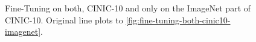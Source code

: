 \begin{figure}
\caption{Fine-Tuning on both, CINIC-10 and only on the ImageNet part of CINIC-10. Original line plots to \cref{fig:fine-tuning-both-cinic10-imagenet}.}
\label{fig:fine-tuning-both-cinic10-imagenet-original}

\end{figure}
%
%